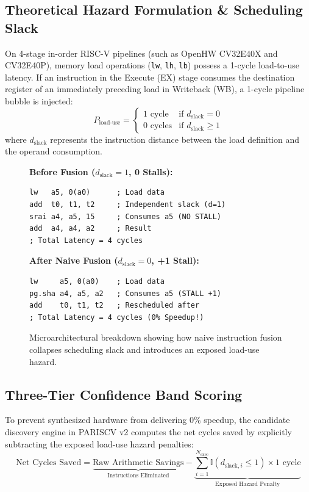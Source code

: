 \documentclass[11pt,a4paper]{article}
\begin{document}
\subsection{Theoretical Hazard Formulation \& Scheduling Slack}
On 4-stage in-order RISC-V pipelines (such as OpenHW CV32E40X and CV32E40P), memory load operations (\texttt{lw}, \texttt{lh}, \texttt{lb}) possess a 1-cycle load-to-use latency. If an instruction in the Execute (EX) stage consumes the destination register of an immediately preceding load in Writeback (WB), a 1-cycle pipeline bubble is injected:
\begin{equation}
    P_{\text{load-use}} = 
    \begin{cases} 
      1 \text{ cycle} & \text{if } d_{\text{slack}} = 0 \\
      0 \text{ cycles} & \text{if } d_{\text{slack}} \ge 1 
    \end{cases}
\end{equation}
where $d_{\text{slack}}$ represents the instruction distance between the load definition and the operand consumption.

\begin{figure}[h!]
\centering
\begin{minipage}{0.48\textwidth}
\textbf{Before Fusion ($d_{\text{slack}}=1$, 0 Stalls):}
\begin{verbatim}
lw   a5, 0(a0)      ; Load data
add  t0, t1, t2     ; Independent slack (d=1)
srai a4, a5, 15     ; Consumes a5 (NO STALL)
add  a4, a4, a2     ; Result
; Total Latency = 4 cycles
\end{verbatim}
\end{minipage}
\hfill
\begin{minipage}{0.48\textwidth}
\textbf{After Naive Fusion ($d_{\text{slack}}=0$, +1 Stall):}
\begin{verbatim}
lw     a5, 0(a0)    ; Load data
pg.sha a4, a5, a2   ; Consumes a5 (STALL +1)
add    t0, t1, t2   ; Rescheduled after
; Total Latency = 4 cycles (0% Speedup!)
\end{verbatim}
\end{minipage}
\caption{Microarchitectural breakdown showing how naive instruction fusion collapses scheduling slack and introduces an exposed load-use hazard.}
\label{fig:hazard_slack}
\end{figure}

\subsection{Three-Tier Confidence Band Scoring}
To prevent synthesized hardware from delivering 0\% speedup, the candidate discovery engine in PARISCV v2 computes the net cycles saved by explicitly subtracting the exposed load-use hazard penalties:
\begin{equation}
    \text{Net Cycles Saved} = \underbrace{\text{Raw Arithmetic Savings}}_{\text{Instructions Eliminated}} - \underbrace{\sum_{i=1}^{N_{\text{exec}}} \mathbb{I}(d_{\text{slack}, i} \le 1) \times 1\text{ cycle}}_{\text{Exposed Hazard Penalty}}
\end{equation}
\end{document}
